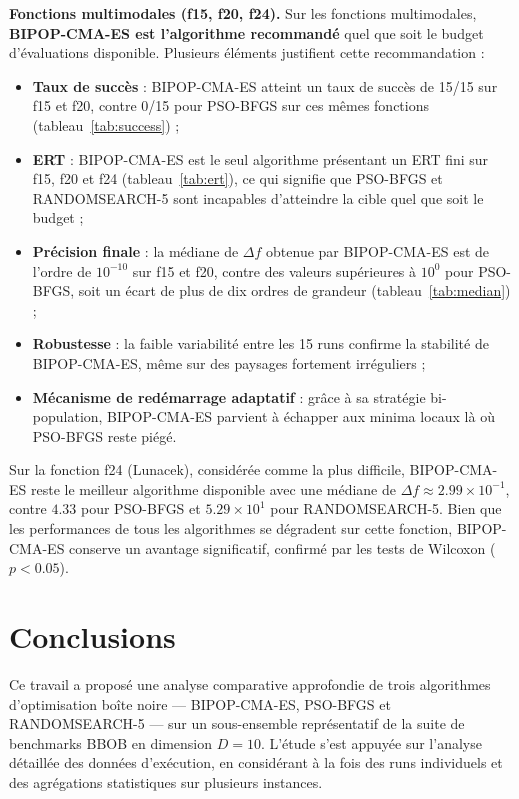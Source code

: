 \documentclass[conference]{IEEEtran}
\begin{document}
\textbf{Fonctions multimodales (f15, f20, f24).} Sur les fonctions multimodales, \textbf{BIPOP-CMA-ES est l'algorithme recommand\'e} quel que soit le budget d'\'evaluations disponible. Plusieurs \'el\'ements justifient cette recommandation :
\begin{itemize}
    \item \textbf{Taux de succ\`es} : BIPOP-CMA-ES atteint un taux de succ\`es de 15/15 sur f15 et f20, contre 0/15 pour PSO-BFGS sur ces m\^emes fonctions (tableau~\ref{tab:success}) ;
    \item \textbf{ERT} : BIPOP-CMA-ES est le seul algorithme pr\'esentant un ERT fini sur f15, f20 et f24 (tableau~\ref{tab:ert}), ce qui signifie que PSO-BFGS et RANDOMSEARCH-5 sont incapables d'atteindre la cible quel que soit le budget ;
    \item \textbf{Pr\'ecision finale} : la m\'ediane de $\Delta f$ obtenue par BIPOP-CMA-ES est de l'ordre de $10^{-10}$ sur f15 et f20, contre des valeurs sup\'erieures \`a $10^0$ pour PSO-BFGS, soit un \'ecart de plus de dix ordres de grandeur (tableau~\ref{tab:median}) ;
    \item \textbf{Robustesse} : la faible variabilit\'e entre les 15 runs confirme la stabilit\'e de BIPOP-CMA-ES, m\^eme sur des paysages fortement irr\'eguliers ;
    \item \textbf{M\'ecanisme de red\'emarrage adaptatif} : gr\^ace \`a sa strat\'egie bi-population, BIPOP-CMA-ES parvient \`a \'echapper aux minima locaux l\`a o\`u PSO-BFGS reste pi\'eg\'e.
\end{itemize}

Sur la fonction f24 (Lunacek), consid\'er\'ee comme la plus difficile, BIPOP-CMA-ES reste le meilleur algorithme disponible avec une m\'ediane de $\Delta f \approx 2.99 \times 10^{-1}$, contre $4.33$ pour PSO-BFGS et $5.29 \times 10^1$ pour RANDOMSEARCH-5. Bien que les performances de tous les algorithmes se d\'egradent sur cette fonction, BIPOP-CMA-ES conserve un avantage significatif, confirm\'e par les tests de Wilcoxon ($p < 0.05$).

\section{Conclusions}

Ce travail a propos\'e une analyse comparative approfondie de trois algorithmes d'optimisation bo\^ite noire --- BIPOP-CMA-ES, PSO-BFGS et RANDOMSEARCH-5 --- sur un sous-ensemble repr\'esentatif de la suite de benchmarks BBOB en dimension $D = 10$. L'\'etude s'est appuy\'ee sur l'analyse d\'etaill\'ee des donn\'ees d'ex\'ecution, en consid\'erant \`a la fois des runs individuels et des agr\'egations statistiques sur plusieurs instances.
\end{document}
